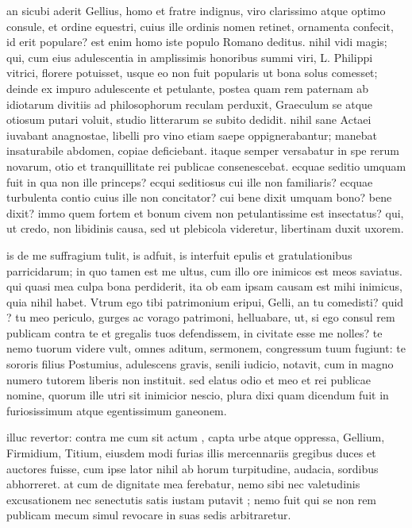 an sicubi aderit Gellius, homo et fratre indignus, viro clarissimo atque optimo consule, et ordine equestri, cuius ille ordinis nomen retinet, ornamenta confecit, id erit populare? est enim homo iste populo Romano deditus. nihil vidi magis; qui, cum eius adulescentia in amplissimis honoribus summi viri, L. Philippi vitrici, florere potuisset, usque eo non fuit popularis ut bona solus comesset; deinde ex impuro adulescente et petulante, postea quam rem paternam ab idiotarum divitiis ad philosophorum reculam perduxit, Graeculum se atque otiosum putari voluit, studio litterarum se subito dedidit. nihil sane Actaei iuvabant anagnostae, libelli pro vino etiam saepe oppignerabantur; manebat insaturabile abdomen, copiae deficiebant. itaque semper versabatur in spe rerum novarum, otio et tranquillitate rei publicae consenescebat. ecquae seditio umquam fuit in qua non ille princeps? ecqui seditiosus cui ille non familiaris? ecquae turbulenta contio cuius ille non concitator? cui bene dixit umquam bono? bene dixit? immo quem fortem et bonum civem non petulantissime est insectatus? qui, ut credo, non libidinis causa, sed ut plebicola videretur, libertinam duxit uxorem.

 is de me suffragium tulit, is adfuit, is interfuit epulis et gratulationibus parricidarum; in quo tamen est me ultus, cum illo ore inimicos est meos saviatus. qui quasi mea culpa bona perdiderit, ita ob eam ipsam causam est mihi inimicus, quia nihil habet. Vtrum ego tibi patrimonium eripui, Gelli, an tu comedisti? quid ? tu meo periculo, gurges ac vorago patrimoni, helluabare, ut, si ego consul rem publicam contra te et gregalis tuos defendissem, in civitate esse me nolles? te nemo tuorum videre vult, omnes aditum, sermonem, congressum tuum fugiunt: te sororis filius Postumius, adulescens gravis, senili iudicio, notavit, cum in magno numero tutorem liberis non instituit. sed elatus odio et meo et rei publicae nomine, quorum ille utri sit inimicior nescio, plura dixi quam dicendum fuit in furiosissimum atque egentissimum ganeonem.

 illuc revertor: contra me cum sit actum , capta urbe atque oppressa, Gellium, Firmidium, Titium, eiusdem modi furias illis mercennariis gregibus duces et auctores fuisse, cum ipse lator nihil ab horum turpitudine, audacia, sordibus abhorreret. at cum de dignitate mea ferebatur, nemo sibi nec valetudinis excusationem nec senectutis satis iustam putavit ; nemo fuit qui se non rem publicam mecum simul revocare in suas sedis arbitraretur.

